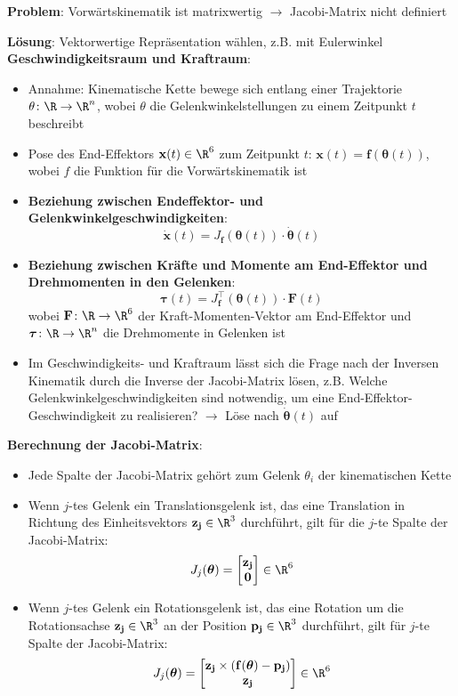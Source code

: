 \textbf{Problem}: Vorwärtskinematik ist matrixwertig $\rightarrow$ Jacobi-Matrix nicht definiert

\textbf{Lösung}: Vektorwertige Repräsentation wählen, z.B. mit Eulerwinkel\\

\textbf{Geschwindigkeitsraum und Kraftraum}:
\begin{itemize}
	\item Annahme: Kinematische Kette bewege sich entlang einer Trajektorie $\theta\colon\R\rightarrow\R^n$, wobei $\theta$ die Gelenkwinkelstellungen zu einem Zeitpunkt $t$ beschreibt
	\item Pose des End-Effektors $\mathbf{x}(t)\in\R^6$ zum Zeitpunkt $t$: $\mathbf{x}(t)=\mathbf{f}(\boldsymbol{\theta}(t))$, wobei $f$ die Funktion für die Vorwärtskinematik ist
	\item \textbf{Beziehung zwischen Endeffektor- und Gelenkwinkelgeschwindigkeiten}: $$\mathbf{\dot{x}}(t)=J_\mathbf{f}(\boldsymbol{\theta}(t))\cdot\boldsymbol{\dot{\theta}}(t)$$
	\item \textbf{Beziehung zwischen Kräfte und Momente am End-Effektor und Drehmomenten in den Gelenken}:
	$$\boldsymbol{\tau}(t)=J_\mathbf{f}^\top(\boldsymbol{\theta}(t))\cdot\mathbf{F}(t)$$
	wobei $\mathbf{F}\colon\R\rightarrow\R^6$ der Kraft-Momenten-Vektor am End-Effektor und $\boldsymbol{\tau}\colon\R\rightarrow\R^n$ die Drehmomente in Gelenken ist
	\item Im Geschwindigkeits- und Kraftraum lässt sich die Frage nach der Inversen Kinematik durch die Inverse der Jacobi-Matrix lösen, z.B. Welche Gelenkwinkelgeschwindigkeiten sind notwendig, um eine End-Effektor-Geschwindigkeit zu realisieren? $\rightarrow$ Löse nach $\boldsymbol{\dot{\theta}}(t)$ auf
\end{itemize}
\bigskip
\textbf{Berechnung der Jacobi-Matrix}:
\begin{itemize}
	\item Jede Spalte der Jacobi-Matrix gehört zum Gelenk $\theta_i$ der kinematischen Kette
	\item Wenn $j$-tes Gelenk ein Translationsgelenk ist, das eine Translation in Richtung des Einheitsvektors $\mathbf{z_j}\in\R^3$ durchführt, gilt für die $j$-te Spalte der Jacobi-Matrix:
	$$J_j(\boldsymbol{\theta})=\left[\begin{matrix}
		\mathbf{z_j} \\
		\mathbf{0}
	\end{matrix}\right]\in\R^6$$
	\item Wenn $j$-tes Gelenk ein Rotationsgelenk ist, das eine Rotation um die Rotationsachse $\mathbf{z_j}\in\R^3$ an der Position $\mathbf{p_j}\in\R^3$ durchführt, gilt für $j$-te Spalte der Jacobi-Matrix:
	$$J_j(\boldsymbol{\theta})=\left[\begin{matrix}
		\mathbf{z_j}\times(\mathbf{f}(\boldsymbol{\theta})-\mathbf{p_j}) \\
		\mathbf{z_j}
	\end{matrix}\right]\in\R^6$$
\end{itemize}

